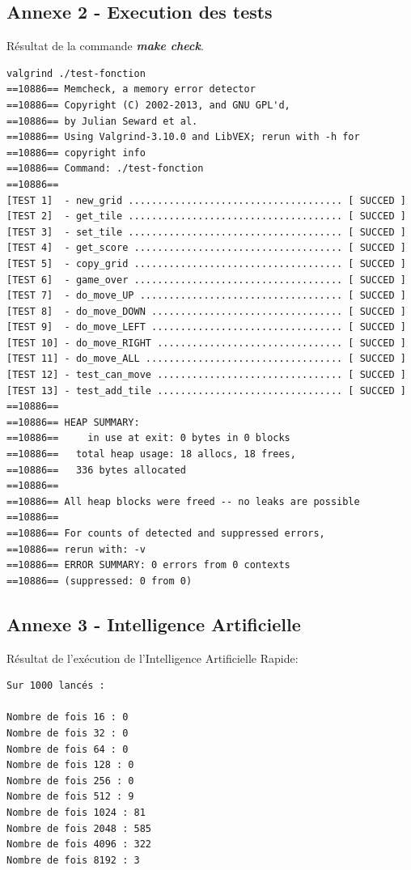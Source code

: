 \documentclass[a4paper]{article}
\begin{document}
\subsection{Annexe 2 - Execution des tests}
\label{sec-7-2}
\noindent
Résultat de la commande \textbf{\emph{make check}}.

\begin{verbatim}
valgrind ./test-fonction
==10886== Memcheck, a memory error detector
==10886== Copyright (C) 2002-2013, and GNU GPL'd, 
==10886== by Julian Seward et al.
==10886== Using Valgrind-3.10.0 and LibVEX; rerun with -h for
==10886== copyright info
==10886== Command: ./test-fonction
==10886== 
[TEST 1]  - new_grid ..................................... [ SUCCED ]
[TEST 2]  - get_tile ..................................... [ SUCCED ]
[TEST 3]  - set_tile ..................................... [ SUCCED ]
[TEST 4]  - get_score .................................... [ SUCCED ]
[TEST 5]  - copy_grid .................................... [ SUCCED ]
[TEST 6]  - game_over .................................... [ SUCCED ]
[TEST 7]  - do_move_UP ................................... [ SUCCED ]
[TEST 8]  - do_move_DOWN ................................. [ SUCCED ]
[TEST 9]  - do_move_LEFT ................................. [ SUCCED ]
[TEST 10] - do_move_RIGHT ................................ [ SUCCED ]
[TEST 11] - do_move_ALL .................................. [ SUCCED ]
[TEST 12] - test_can_move ................................ [ SUCCED ]
[TEST 13] - test_add_tile ................................ [ SUCCED ]
==10886== 
==10886== HEAP SUMMARY:
==10886==     in use at exit: 0 bytes in 0 blocks
==10886==   total heap usage: 18 allocs, 18 frees, 
==10886==   336 bytes allocated
==10886== 
==10886== All heap blocks were freed -- no leaks are possible
==10886== 
==10886== For counts of detected and suppressed errors,
==10886== rerun with: -v
==10886== ERROR SUMMARY: 0 errors from 0 contexts
==10886== (suppressed: 0 from 0)
\end{verbatim}
\newpage
\subsection{Annexe 3 - Intelligence Artificielle}
\label{sec-7-3}
\noindent
Résultat de l'exécution de l'Intelligence Artificielle Rapide:
\begin{verbatim}
Sur 1000 lancés :

Nombre de fois 16 : 0
Nombre de fois 32 : 0
Nombre de fois 64 : 0
Nombre de fois 128 : 0
Nombre de fois 256 : 0
Nombre de fois 512 : 9
Nombre de fois 1024 : 81
Nombre de fois 2048 : 585
Nombre de fois 4096 : 322
Nombre de fois 8192 : 3
\end{verbatim}
\end{document}
